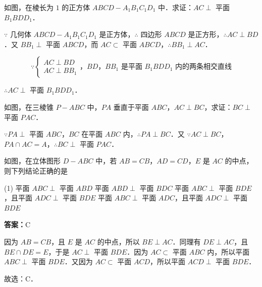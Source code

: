 \begin{example}[\bkstar{2}{5}]
如图，在棱长为 $1$ 的正方体 $ABCD-A_1B_1C_1D_1$ 中．求证：$AC\perp$ 平面 $B_1BDD_1$．
\end{example}
\begin{solution}
$\because$ 几何体 $ABCD-A_1B_1C_1D_1$ 是正方体，$\therefore$ 四边形 $ABCD$ 是正方形，$\therefore AC\perp BD$．又 $BB_1\perp$ 平面 $ABCD$，而 $AC\subset$ 平面 $ABCD$，$\therefore BB_1\perp AC$．

$$
\because \begin{cases} AC\perp BD \\ AC\perp BB_1 \end{cases}\text{，$BD$，$BB_1$ 是平面 $B_1BDD_1$ 内的两条相交直线}
$$

$\therefore AC\perp$ 平面 $B_1BDD_1$．
\end{solution}

\vspace{2em}

\begin{example}[\bkstar{2}{5}]
如图，在三棱锥 $P-ABC$ 中，$PA$ 垂直于平面 $ABC$，$AC\perp BC$，求证：$BC\perp$ 平面 $PAC$．
\end{example}
\begin{solution}
$\because PA\perp$ 平面 $ABC$，$BC$ 在平面 $ABC$ 内，$\therefore PA\perp BC$．又 $\because AC\perp BC$，$PA\cap AC=A$，$\therefore BC\perp$ 平面 $PAC$．
\end{solution}

\vspace{2em}


\begin{example}[\bkstar{2}{5}]
如图，在立体图形 $D-ABC$ 中，若 $AB=CB$，$AD=CD$，$E$ 是 $AC$ 的中点，则下列结论正确的是
\begin{tasks}(1)
    \task 平面 $ABC\perp$ 平面 $ABD$
    \task 平面 $ABD\perp$ 平面 $BDC$
    \task 平面 $ABC\perp$ 平面 $BDE$，且平面 $ADC\perp$ 平面 $BDE$
    \task 平面 $ABC\perp$ 平面 $ADC$，且平面 $ADC\perp$ 平面 $BDE$
\end{tasks}
\end{example}
\begin{solution}
\textbf{答案：}C

因为 $AB=CB$，且 $E$ 是 $AC$ 的中点，所以 $BE\perp AC$．同理有 $DE\perp AC$，且 $BE\cap DE=E$，于是 $AC\perp$ 平面 $BDE$．因为 $AC\subset$ 平面 $ABC$ 内，所以平面 $ABC\perp$ 平面 $BDE$．又因为 $AC\subset$ 平面 $ACD$，所以平面 $ACD\perp$ 平面 $BDE$．

故选：C．
\end{solution}

